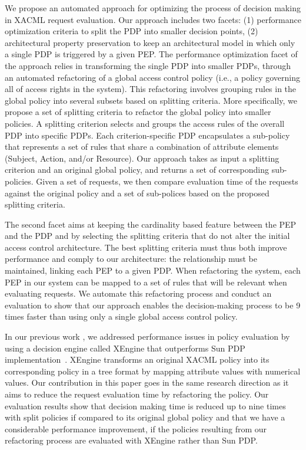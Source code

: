 We propose an automated approach for optimizing the process of decision making in XACML request evaluation. 
Our approach includes two facets: (1) performance optimization criteria to split the PDP into smaller decision points,
(2) architectural property preservation to keep an architectural model in which only a single PDP is triggered by a given PEP. 
The performance optimization facet of the approach relies in transforming the single PDP into smaller PDPs,
through an automated refactoring of a global access control policy (i.e., a policy governing all of access rights in the system).
This refactoring involves grouping rules in the global policy into several subsets based on splitting criteria. More specifically, we propose a set of splitting criteria to
 refactor the global policy into smaller policies.
A splitting criterion selects and groups the access rules of the overall PDP into specific PDPs.
Each criterion-specific PDP encapsulates a sub-policy that represents a set of rules that share a combination
of attribute elements (Subject, Action, and/or Resource). Our approach takes as input a splitting criterion and an original global policy, and returns a set of 
corresponding sub-policies. Given a set of requests, we then compare evaluation time of the requests against the original policy and a set of sub-polices 
based on the proposed splitting criteria.

The second facet aims at keeping the cardinality based feature between the PEP and the PDP and by selecting the splitting criteria that
do not alter the initial access control architecture. The best splitting criteria must thus both improve performance and comply to our architecture: the relationship must be maintained,
linking each PEP to a given PDP. When refactoring the system, each PEP in our system can be mapped to a set of rules that will be relevant when evaluating
requests. We automate this refactoring process and conduct an evaluation to show that our approach enables the decision-making process to be 9 times faster than
using only a single global access control policy.

In our previous work \cite{Xengine}, we addressed performance issues in policy evaluation by using
a decision engine called XEngine that outperforms Sun PDP implementation~\cite{oasis}. XEngine transforms an original XACML policy
into its corresponding policy in a tree format by mapping attribute values with numerical values.
Our contribution in this paper goes in the same research direction as it aims to reduce the request evaluation time by refactoring the policy.
Our evaluation results show that decision making time is reduced up to nine times with split policies if compared to its original global policy 
and that we have a considerable performance improvement, if the policies resulting from our refactoring process are evaluated
with XEngine rather than Sun PDP.

